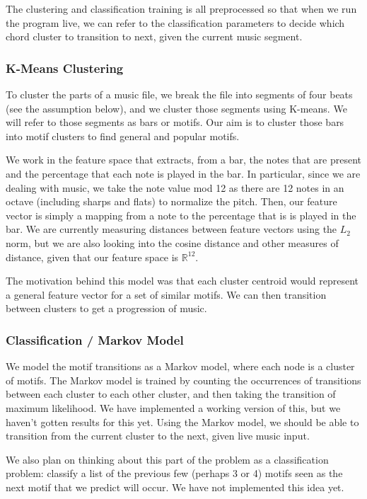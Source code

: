 \documentclass[a4paper, 12pt]{article}
\begin{document}
The clustering and classification training is all preprocessed so that when we run the program live, we can refer to the classification parameters to decide which chord cluster to transition to next, given the current music segment.

\subsubsection{K-Means Clustering}

To cluster the parts of a music file, we break the file into segments of four beats (see the assumption below), and we cluster those segments using K-means. We will refer to those segments as bars or motifs. Our aim is to cluster those bars into motif clusters to find general and popular motifs.

We work in the feature space that extracts, from a bar, the notes that are present and the percentage that each note is played in the bar. In particular, since we are dealing with music, we take the note value mod 12 as there are 12 notes in an octave (including sharps and flats) to normalize the pitch. Then, our feature vector is simply a mapping from a note to the percentage that is is played in the bar. We are currently measuring distances between feature vectors using the $L_2$ norm, but we are also looking into the cosine distance and other measures of distance, given that our feature space is $\mathbb{R}^{12}$.

The motivation behind this model was that each cluster centroid would represent a general feature vector for a set of similar motifs. We can then transition between clusters to get a progression of music.

\subsubsection{Classification / Markov Model}

We model the motif transitions as a Markov model, where each node is a cluster of motifs. The Markov model is trained by counting the occurrences of transitions between each cluster to each other cluster, and then taking the transition of maximum likelihood. We have implemented a working version of this, but we haven't gotten results for this yet. Using the Markov model, we should be able to transition from the current cluster to the next, given live music input.

We also plan on thinking about this part of the problem as a classification problem: classify a list of the previous few (perhaps 3 or 4) motifs seen as the next motif that we predict will occur. We have not implemented this idea yet.
\end{document}
